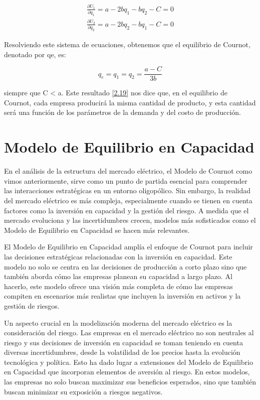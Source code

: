 \begin{gather}
\frac{\partial U_1}{\partial q_1}= a - 2bq_1 - bq_2 - C = 0\label{2.17}  \\ 
\frac{\partial U_2}{\partial q_2}= a - 2bq_2 - bq_1 - C = 0 \label{2.18} 
\end{gather}



Resolviendo este sistema de ecuaciones, obtenemos que el equilibrio de Cournot, denotado por qe, es:

\begin{equation}
q_e = q_1 = q_2 = \frac{a - C}{3b}\label{2.19} 
\end{equation}

siempre que C < a. Este resultado \ref{2.19} nos dice que, en el equilibrio de Cournot, cada empresa producirá la misma cantidad de producto, y esta cantidad será una función de los parámetros de la demanda y del costo de producción.

\section{Modelo de Equilibrio en Capacidad}\label{c28}

En el análisis de la estructura del mercado eléctrico, el Modelo de Cournot como vimos anteriormente, sirve como un punto de partida esencial para comprender las interacciones estratégicas en un entorno oligopólico. Sin embargo, la realidad del mercado eléctrico es más compleja, especialmente cuando se tienen en cuenta factores como la inversión en capacidad y la gestión del riesgo. A medida que el mercado evoluciona y las incertidumbres crecen, modelos más sofisticados como el Modelo de Equilibrio en Capacidad se hacen más relevantes.

\vspace{2.5mm}
El Modelo de Equilibrio en Capacidad amplía el enfoque de Cournot para incluir las decisiones estratégicas relacionadas con la inversión en capacidad. Este modelo no solo se centra en las decisiones de producción a corto plazo sino que también aborda cómo las empresas planean su capacidad a largo plazo. Al hacerlo, este modelo ofrece una visión más completa de cómo las empresas compiten en escenarios más realistas que incluyen la inversión en activos y la gestión de riesgos.

\vspace{2.5mm}
Un aspecto crucial en la modelización moderna del mercado eléctrico es la consideración del riesgo. Las empresas en el mercado eléctrico no son neutrales al riesgo y sus decisiones de inversión en capacidad se toman teniendo en cuenta diversas incertidumbres, desde la volatilidad de los precios hasta la evolución tecnológica y política. Esto ha dado lugar a extensiones del Modelo de Equilibrio en Capacidad que incorporan elementos de aversión al riesgo. En estos modelos, las empresas no solo buscan maximizar sus beneficios esperados, sino que también buscan minimizar su exposición a riesgos negativos.


